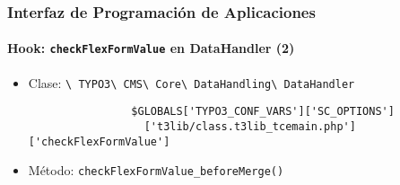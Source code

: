 
\begin{frame}[fragile]
	\frametitle{Interfaz de Programación de Aplicaciones}
	\framesubtitle{Hook: \texttt{checkFlexFormValue} en DataHandler (2)}

	\begin{itemize}
		\item Clase:\newline
			\smaller
				\texttt{\textbackslash
					TYPO3\textbackslash
					CMS\textbackslash
					Core\textbackslash
					DataHandling\textbackslash
					DataHandler}\normalsize

			\lstset{
				basicstyle=\smaller\ttfamily
			}

			\begin{lstlisting}
				$GLOBALS['TYPO3_CONF_VARS']['SC_OPTIONS']
				  ['t3lib/class.t3lib_tcemain.php']['checkFlexFormValue']
			\end{lstlisting}

		\item Método:\newline
			\smaller
				\texttt{checkFlexFormValue\_beforeMerge()}

	\end{itemize}

\end{frame}


